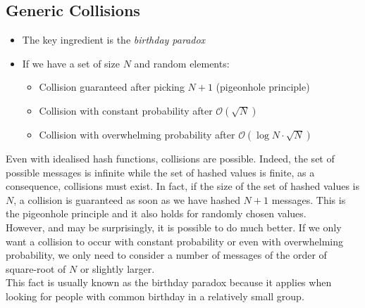 	\subsection{Generic Collisions}
		\begin{itemize}
			\item The key ingredient is the \textit{birthday paradox}
			\item If we have a set of size $N$ and random elements:
			\begin{itemize}
				\item Collision guaranteed after picking $N+1$ (pigeonhole principle)
				\item Collision with constant probability after $\mathcal{O}(\sqrt{N})$
				\item Collision with overwhelming probability after $\mathcal{O}(\log N \cdot \sqrt{N})$
			\end{itemize}
		\end{itemize}
		Even with idealised hash functions, collisions are possible. 
		Indeed, the set of possible messages is infinite while the set of hashed values is finite, as a consequence, collisions must exist. 
		In fact, if the size of the set of hashed values is $N$, a collision is guaranteed as soon as we have hashed $N+1$ messages. 
		This is the pigeonhole principle and it also holds for randomly chosen values.\\
		However, and may be surprisingly, it is possible to do much better. 
		If we only want a collision to occur with constant probability or even with overwhelming probability, we only need to consider 
		a number of messages of the order of square-root of $N$ or slightly larger.\\
		This fact is usually known as the birthday paradox because it applies when looking for people with common birthday in a relatively small group.
	
